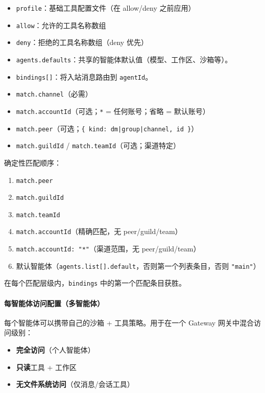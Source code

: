 \begin{itemize}
  \item \texttt{profile}：基础工具配置文件（在 allow/deny 之前应用）
  \item \texttt{allow}：允许的工具名称数组
  \item \texttt{deny}：拒绝的工具名称数组（deny 优先）
  \item \texttt{agents.defaults}：共享的智能体默认值（模型、工作区、沙箱等）。
  \item \texttt{bindings[]}：将入站消息路由到 \texttt{agentId}。
  \item \texttt{match.channel}（必需）
  \item \texttt{match.accountId}（可选；\texttt{*} = 任何账号；省略 = 默认账号）
  \item \texttt{match.peer}（可选；\texttt{\{ kind: dm|group|channel, id \}}）
  \item \texttt{match.guildId} / \texttt{match.teamId}（可选；渠道特定）
\end{itemize}


确定性匹配顺序：

\begin{enumerate}
  \item \texttt{match.peer}
  \item \texttt{match.guildId}
  \item \texttt{match.teamId}
  \item \texttt{match.accountId}（精确匹配，无 peer/guild/team）
  \item \texttt{match.accountId: "*"}（渠道范围，无 peer/guild/team）
  \item 默认智能体（\texttt{agents.list[].default}，否则第一个列表条目，否则 \texttt{"main"}）
\end{enumerate}


在每个匹配层级内，\texttt{bindings} 中的第一个匹配条目获胜。

\paragraph{每智能体访问配置（多智能体）}


每个智能体可以携带自己的沙箱 + 工具策略。用于在一个 Gateway 网关中混合访问级别：

\begin{itemize}
  \item \textbf{完全访问}（个人智能体）
  \item \textbf{只读}工具 + 工作区
  \item \textbf{无文件系统访问}（仅消息/会话工具）
\end{itemize}


